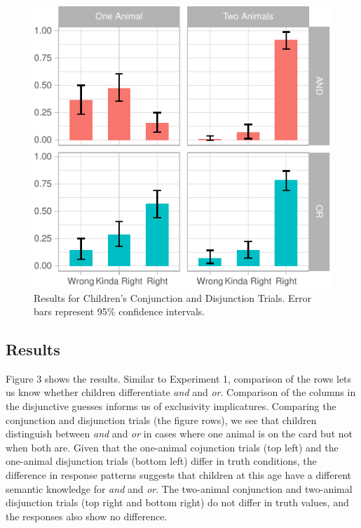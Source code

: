 \documentclass[10pt, letterpaper]{article}
\newenvironment{CodeChunk}{}{}
\begin{document}
\begin{CodeChunk}
\begin{figure}[h]

{\centering \includegraphics{figs/child_data-1} 

}

\caption[Results for Children's Conjunction and Disjunction Trials]{Results for Children's Conjunction and Disjunction Trials. Error bars represent 95\% confidence intervals.}\label{fig:child_data}
\end{figure}
\end{CodeChunk}

\subsection{Results}\label{results-1}

Figure 3 shows the results. Similar to Experiment 1, comparison of the
rows lets us know whether children differentiate \emph{and} and
\emph{or}. Comparison of the columns in the disjunctive guesses informs
us of exclusivity implicatures. Comparing the conjunction and
disjunction trials (the figure rows), we see that children distinguish
between \emph{and} and \emph{or} in cases where one animal is on the
card but not when both are. Given that the one-animal cojunction trials
(top left) and the one-animal disjunction trials (bottom left) differ in
truth conditions, the difference in response patterns suggests that
children at this age have a different semantic knowledge for \emph{and}
and \emph{or}. The two-animal conjunction and two-animal disjunction
trials (top right and bottom right) do not differ in truth values, and
the responses also show no difference.
\end{document}
